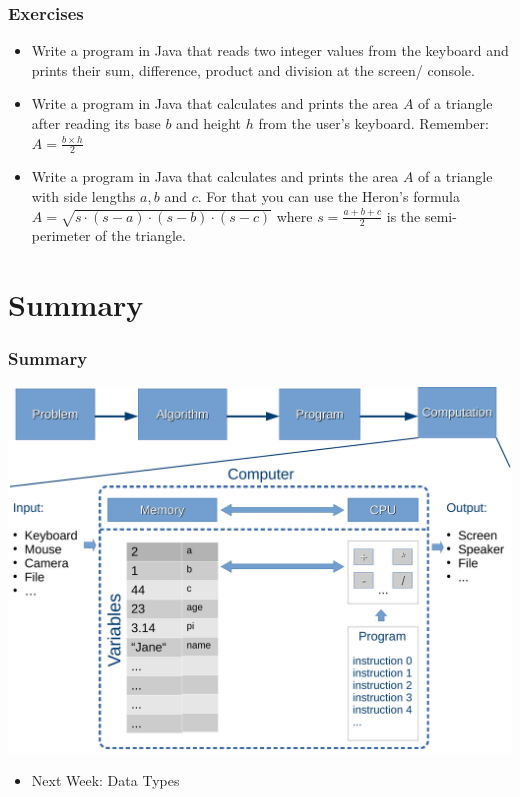 \documentclass{beamer}
\begin{document}
	\begin{frame}
		\frametitle{Exercises}
		\begin{itemize}
			\item Write a program in Java that reads two integer values from the keyboard and prints their sum, difference, product and division at the screen/ console.
			\pause
			\item Write a program in Java that calculates and prints the area $A$ of a triangle after reading its base $b$ and height $h$ from the user's keyboard. Remember: $A = \frac{b \times h}{2}$
			\pause
			\item Write a program in Java that calculates and prints the area $A$ of a triangle with side lengths $a, b$ and $c$. For that you can use the Heron's formula $A = \sqrt{s \cdot (s-a) \cdot (s-b) \cdot (s-c)}$ where $s = \frac{a+b+c}{2}$ is the semi-perimeter of the triangle.
		\end{itemize}
	\end{frame}

	
	\section{Summary}

	\begin{frame}
		\frametitle{Summary}
		\centering
		\includegraphics[width=.7\textwidth]{Memory-CPU-Scheme}
		\begin{itemize}
			\item Next Week: Data Types
		\end{itemize}
	\end{frame}
\end{document}

